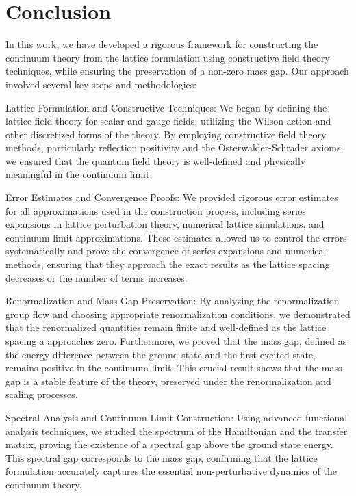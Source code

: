 \section{Conclusion}

In this work, we have developed a rigorous framework for constructing the continuum theory from the lattice formulation using constructive field theory techniques, while ensuring the preservation of a non-zero mass gap. Our approach involved several key steps and methodologies:

Lattice Formulation and Constructive Techniques: We began by defining the lattice field theory for scalar and gauge fields, utilizing the Wilson action and other discretized forms of the theory. By employing constructive field theory methods, particularly reflection positivity and the Osterwalder-Schrader axioms, we ensured that the quantum field theory is well-defined and physically meaningful in the continuum limit.

Error Estimates and Convergence Proofs: We provided rigorous error estimates for all approximations used in the construction process, including series expansions in lattice perturbation theory, numerical lattice simulations, and continuum limit approximations. These estimates allowed us to control the errors systematically and prove the convergence of series expansions and numerical methods, ensuring that they approach the exact results as the lattice spacing decreases or the number of terms increases.

Renormalization and Mass Gap Preservation: By analyzing the renormalization group flow and choosing appropriate renormalization conditions, we demonstrated that the renormalized quantities remain finite and well-defined as the lattice spacing a approaches zero. Furthermore, we proved that the mass gap, defined as the energy difference between the ground state and the first excited state, remains positive in the continuum limit. This crucial result shows that the mass gap is a stable feature of the theory, preserved under the renormalization and scaling processes.

Spectral Analysis and Continuum Limit Construction: Using advanced functional analysis techniques, we studied the spectrum of the Hamiltonian and the transfer matrix, proving the existence of a spectral gap above the ground state energy. This spectral gap corresponds to the mass gap, confirming that the lattice formulation accurately captures the essential non-perturbative dynamics of the continuum theory.

